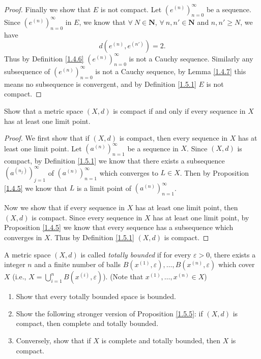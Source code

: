 \begin{proof}
    Finally we show that \(E\) is not compact.
    Let \((e^{(n)})_{n = 0}^\infty\) be a sequence.
    Since \((e^{(n)})_{n = 0}^\infty\) in \(E\), we know that \(\forall\ N \in \mathbf{N}\), \(\forall\ n, n' \in \mathbf{N}\) and \(n, n' \geq N\), we have
    \[
        d(e^{(n)}, e^{(n')}) = 2.
    \]
    Thus by Definition \ref{1.4.6} \((e^{(n)})_{n = 0}^\infty\) is not a Cauchy sequence.
    Similarly any subsequence of \((e^{(n)})_{n = 0}^\infty\) is not a Cauchy sequence, by Lemma \ref{1.4.7} this means no subsequence is convergent, and by Definition \ref{1.5.1} \(E\) is not compact.
\end{proof}

\begin{exercise}\label{ex 1.5.9}
    Show that a metric space \((X, d)\) is compact if and only if every sequence in \(X\) has at least one limit point.
\end{exercise}

\begin{proof}
    We first show that if \((X, d)\) is compact, then every sequence in \(X\) has at least one limit point.
    Let \((a^{(n)})_{n = 1}^\infty\) be a sequence in \(X\).
    Since \((X, d)\) is compact, by Definition \ref{1.5.1} we know that there exists a subsequence \((a^{(n_j)})_{j = 1}^\infty\) of \((a^{(n)})_{n = 1}^\infty\) which converges to \(L \in X\).
    Then by Proposition \ref{1.4.5} we know that \(L\) is a limit point of \((a^{(n)})_{n = 1}^\infty\).

    Now we show that if every sequence in \(X\) has at least one limit point, then \((X, d)\) is compact.
    Since every sequence in \(X\) has at least one limit point, by Proposition \ref{1.4.5} we know that every sequence has a subsequence which converges in \(X\).
    Thus by Definition \ref{1.5.1} \((X, d)\) is compact.
\end{proof}

\begin{exercise}\label{ex 1.5.10}
    A metric space \((X, d)\) is called \emph{totally bounded} if for every \(\varepsilon > 0\), there exists a integer \(n\) and a finite number of balls \(B(x^{(1)}, \varepsilon), \dots, B(x^{(n)}, \varepsilon)\) which cover \(X\) (i.e., \(X = \bigcup_{i = 1}^n B(x^{(i)}, \varepsilon)\)).
    (Note that \(x^{(1)}, \dots, x^{(n)} \in X\))
    \begin{enumerate}
        \item Show that every totally bounded space is bounded.
        \item Show the following stronger version of Proposition \ref{1.5.5}:
              if \((X, d)\) is compact, then complete and totally bounded.
        \item Conversely, show that if \(X\) is complete and totally bounded, then \(X\) is compact.
    \end{enumerate}
\end{exercise}

